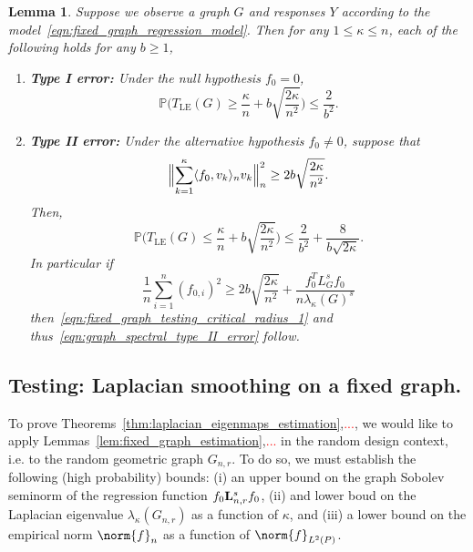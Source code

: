 \documentclass{article}
\newcommand{\1}{\mathbf{1}}
\newcommand{\Lap}{{\bf L}}
\newcommand{\Pbb}{\mathbb{P}}
\newcommand{\dotp}[2]{\langle #1, #2 \rangle}
\newcommand{\LE}{\mathrm{LE}}
\theoremstyle{alden}
\theoremstyle{aldenthm}
\newtheorem{lemma}{Lemma}
\theoremstyle{definition}
\theoremstyle{remark}
\begin{document}
\begin{lemma}
	\label{lem:le_fixed_graph_testing}
	Suppose we observe a graph $G$ and responses $Y$ according to the model~\eqref{eqn:fixed_graph_regression_model}. Then for any $1 \leq \kappa \leq n$, each of the following holds for any $b \geq 1$,
	\begin{enumerate}
		\item \textbf{Type I error:} Under the null hypothesis $f_0 = 0$,
		\begin{equation}
		\label{eqn:graph_spectral_type_I_error}
		\Pbb\biggl(T_{\LE}(G) \geq \frac{\kappa}{n} + b\sqrt{\frac{2\kappa}{n^2}}\biggr) \leq \frac{2}{b^2}.
		\end{equation}
		\item \textbf{Type II error:} Under the alternative hypothesis $f_0 \neq 0$, suppose that
		\begin{equation}
		\label{eqn:fixed_graph_testing_critical_radius_1}
		\Bigl\|\sum_{k = 1}^{\kappa} \dotp{f_0}{v_k}_n v_k\Bigr\|_n^2 \geq 2b\sqrt{\frac{2\kappa}{n^2}}.
		\end{equation}
		Then,
		\begin{equation}
		\label{eqn:graph_spectral_type_II_error}
		\Pbb\biggl(T_{\LE}(G) \leq \frac{\kappa}{n} + b\sqrt{\frac{2\kappa}{n^2}}\biggr) \leq \frac{2}{b^2} + \frac{8}{b\sqrt{2\kappa}}.
		\end{equation}
		In particular if
		\begin{equation}
		\label{eqn:fixed_graph_testing_critical_radius}
		\frac{1}{n} \sum_{i = 1}^{n} (f_{0,i})^2 \geq 2b\sqrt{\frac{2\kappa}{n^2}} + \frac{f_0^T L_G^s f_0}{n\lambda_{\kappa}(G)^s}
		\end{equation}
		then~\eqref{eqn:fixed_graph_testing_critical_radius_1} and thus~\eqref{eqn:graph_spectral_type_II_error} follow.
	\end{enumerate}
\end{lemma}

\subsection{Testing: Laplacian smoothing on a fixed graph.}

\clearpage
To prove Theorems~\ref{thm:laplacian_eigenmaps_estimation},\textcolor{red}{...}, we would like to apply Lemmas~\ref{lem:fixed_graph_estimation},\textcolor{red}{...} in the random design context, i.e. to the random geometric graph $G_{n,r}$. To do so, we must establish the following (high probability) bounds: (i) an upper bound on the graph Sobolev seminorm of the regression function $f_0 \Lap_{n,r}^s f_0$, (ii) and lower boud on the Laplacian eigenvalue $\lambda_{\kappa}(G_{n,r})$ as a function of $\kappa$, and (iii) a lower bound on the empirical norm $\norm{f}_{n}$ as a function of $\norm{f}_{L^2(P)}$. 
\end{document}

